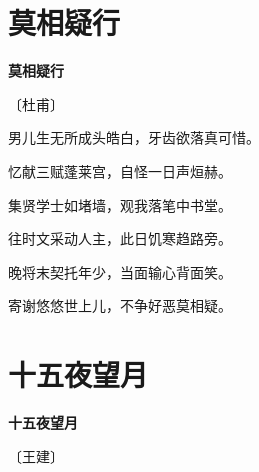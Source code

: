 \documentclass[12pt,UTF-8,openany,fontset=none]{ctexbook}
\begin{document}
\vspace{8pt}
\clearpage

\section{莫相疑行}


\begin{center}
    {\bfseries 莫相疑行}

    \vspace{18pt}

    \begin{large}\xuwen
        〔杜甫〕
    \end{large}

\end{center}

    \vspace{18pt}  %

\begin{center}
    \begin{Large}

        男儿生无所成头皓白，牙齿欲落真可惜。\phantom{男..}

        忆献三赋蓬莱宫，自怪一日声烜赫。

        集贤学士如堵墙，观我落笔中书堂。

        往时文采动人主，此日饥寒趋路旁。

        晚将末契托年少，当面输心背面笑。

        寄谢悠悠世上儿，不争好恶莫相疑。

    \end{Large}

\end{center}

\vspace{8pt}
\clearpage

\section{十五夜望月}


\begin{center}
    {\bfseries 十五夜望月}

    \vspace{18pt}

    \begin{large}\xuwen
        〔王建〕
    \end{large}

\end{center}
\end{document}
